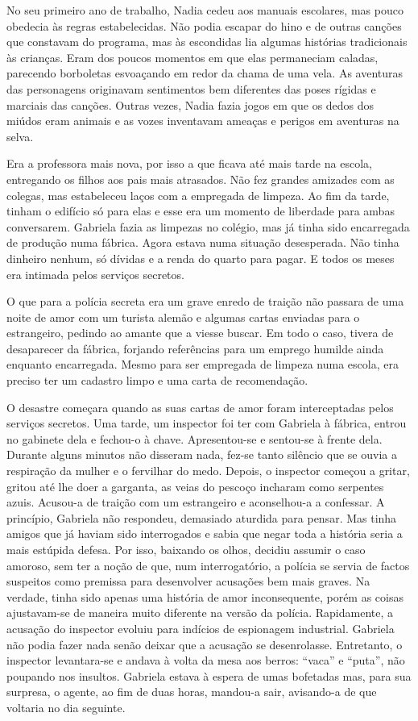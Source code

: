 No seu primeiro ano de trabalho, Nadia cedeu aos manuais escolares, mas
pouco obedecia às regras estabelecidas. Não podia escapar do hino e de
outras canções que constavam do programa, mas às escondidas lia algumas histórias tradicionais às crianças. Eram dos poucos momentos em que
elas permaneciam caladas, parecendo borboletas esvoaçando em redor da
chama de uma vela. As aventuras das personagens originavam sentimentos
bem diferentes das poses rígidas e marciais das canções. Outras vezes,
Nadia fazia jogos em que os dedos dos miúdos eram animais e as vozes
inventavam ameaças e perigos em aventuras na selva.

Era a professora mais nova, por isso a que ficava até mais tarde na
escola, entregando os filhos aos pais mais atrasados. Não fez grandes
amizades com as colegas, mas estabeleceu laços com a empregada de
limpeza. Ao fim da tarde, tinham o edifício só para elas e esse era um
momento de liberdade para ambas conversarem. Gabriela fazia as limpezas
no colégio, mas já tinha sido encarregada de produção numa fábrica.
Agora estava numa
situação desesperada. Não tinha dinheiro nenhum, só dívidas e a renda do
quarto para pagar. E todos os meses era intimada pelos serviços
secretos.

O que para a polícia secreta era um grave enredo de traição não passara
de uma noite de amor com um turista alemão e algumas cartas enviadas
para o estrangeiro, pedindo ao amante que a viesse buscar. Em todo o
caso, tivera de desaparecer da fábrica, forjando referências para um
emprego humilde ainda enquanto encarregada. Mesmo para ser empregada de
limpeza numa escola, era preciso ter um cadastro limpo e uma carta de
recomendação.

O desastre começara quando as suas cartas de amor foram interceptadas
pelos serviços secretos. Uma tarde, um inspector foi ter com Gabriela à
fábrica, entrou no gabinete dela e fechou-o à chave. Apresentou-se e
sentou-se à frente dela. Durante alguns minutos não disseram nada, fez-se
tanto silêncio que se ouvia a respiração da mulher e o fervilhar do
medo. Depois, o inspector começou a gritar, gritou até lhe doer a
garganta, as veias do pescoço incharam como serpentes azuis. Acusou-a de
traição com um estrangeiro e aconselhou-a a confessar. A princípio,
Gabriela não respondeu, demasiado aturdida para pensar. Mas tinha
amigos que já haviam sido interrogados e sabia que negar toda a história
seria a mais estúpida defesa. Por isso, baixando os olhos, decidiu assumir o caso amoroso, sem ter a noção de que, num interrogatório, a
polícia se servia de factos suspeitos como premissa para desenvolver
acusações bem mais graves. Na verdade, tinha sido apenas uma história de
amor inconsequente, porém as coisas ajustavam-se de maneira muito
diferente na
versão da polícia. Rapidamente, a acusação do inspector evoluiu para
indícios de espionagem industrial. Gabriela não podia fazer nada senão
deixar que a acusação se desenrolasse. Entretanto, o inspector
levantara-se e andava à volta da mesa aos berros: ``vaca'' e ``puta'', não
poupando nos insultos. Gabriela estava à espera de umas bofetadas mas,
para sua surpresa, o agente, ao fim de duas horas, mandou-a sair,
avisando-a de que voltaria no dia seguinte.

